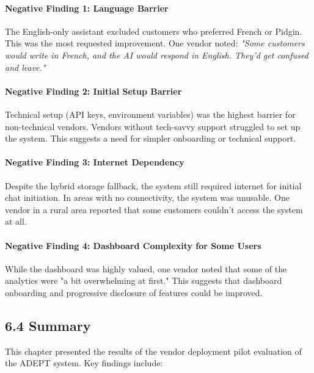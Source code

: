 \documentclass[12pt,a4paper]{article}
\begin{document}
\paragraph{Negative Finding 1: Language Barrier}

The English-only assistant excluded customers who preferred French or Pidgin. This was the most requested improvement. One vendor noted: \textit{"Some customers would write in French, and the AI would respond in English. They'd get confused and leave."}

\paragraph{Negative Finding 2: Initial Setup Barrier}

Technical setup (API keys, environment variables) was the highest barrier for non-technical vendors. Vendors without tech-savvy support struggled to set up the system. This suggests a need for simpler onboarding or technical support.

\paragraph{Negative Finding 3: Internet Dependency}

Despite the hybrid storage fallback, the system still required internet for initial chat initiation. In areas with no connectivity, the system was unusable. One vendor in a rural area reported that some customers couldn't access the system at all.

\paragraph{Negative Finding 4: Dashboard Complexity for Some Users}

While the dashboard was highly valued, one vendor noted that some of the analytics were "a bit overwhelming at first." This suggests that dashboard onboarding and progressive disclosure of features could be improved.

\subsection{6.4 Summary}

This chapter presented the results of the vendor deployment pilot evaluation of the ADEPT system. Key findings include:
\end{document}
